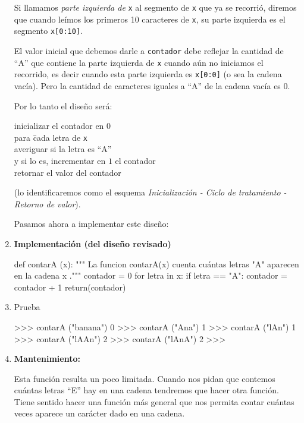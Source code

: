 \begin{enumerate}
Si llamamos {\it parte izquierda de } \lstinline+x+ al segmento de
\lstinline+x+ que ya se recorrió, diremos que cuando leímos los primeros 10
caracteres de \lstinline+x+, su parte izquierda es el segmento
\lstinline+x[0:10]+.

El valor inicial que debemos darle a \lstinline+contador+ debe reflejar la
cantidad de ``A'' que contiene la parte izquierda de \lstinline+x+ cuando
aún no iniciamos el recorrido, es decir cuando esta parte izquierda es
\lstinline+x[0:0]+ (o sea la cadena vacía). Pero la cantidad de caracteres
iguales a ``A'' de la cadena vacía es $0$.

Por lo tanto el diseño será:

\begin{tabbing}
inicializar el contador en $0$\\
para \= cada letra de \lstinline+x+\\
\> averiguar si la letra es ``A'' \\
\> y si lo es, incrementar en $1$ el contador\\
retornar el valor del contador\\
\end{tabbing}

(lo identificaremos como el esquema {\it Inicialización - Ciclo de tratamiento - Retorno de valor}).

Pasamos ahora a implementar este diseño:

\item {\bf Implementación (del diseño revisado)}

\begin{codigo-python}
def contarA (x):
    """ La funcion contarA(x) cuenta cuántas
        letras "A" aparecen en la cadena x ."""
    contador = 0
    for letra in x:
        if letra == "A":
           contador = contador + 1
    return(contador)
\end{codigo-python}

\item Prueba
\begin{codigo-python-sn}
>>> contarA ("banana")
0
>>> contarA ("Ana")
1
>>> contarA ("lAn")
1
>>> contarA ("lAAn")
2
>>> contarA ("lAnA")
2
>>>
\end{codigo-python-sn}

\item {\bf Mantenimiento:}

Esta función resulta un poco limitada. Cuando nos pidan que contemos
cuántas letras ``E'' hay en una cadena tendremos que hacer otra función.
Tiene sentido hacer una función más general que nos permita contar cuántas
veces aparece un carácter dado en una cadena.


\end{enumerate}
